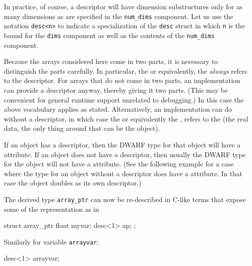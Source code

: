 In practice, of course, a  descriptor will have
dimension substructures only for as many dimensions as are
specified in the \texttt{num\_dims} component. Let us use the notation
\texttt{desc\textless n\textgreater}   
to indicate a specialization of the \texttt{desc} struct in
which \texttt{n} is the bound for the \texttt{dims} component as well as the
contents of the \texttt{num\_dims} component.

Because the arrays considered here come in two parts, it is
necessary to distinguish the parts carefully. In particular,
the  or equivalently, the  \emph{always} refers to the descriptor. For
arrays that do not come in two parts, an implementation can
provide a descriptor anyway, thereby giving it two parts. (This
may be convenient for general runtime support unrelated to
debugging.) In this case the above vocabulary applies as
stated. Alternatively, an implementation can do without a
descriptor, in which case the 
or equivalently the , refers
to the  (the real data, the only thing around
that can be the object).

If an object has a descriptor, then the DWARF type for that
object will have a 
\DWATdatalocation{} 
attribute. If an object
does not have a descriptor, then usually the DWARF type for the
object will not have a 
\DWATdatalocation{} attribute. 
(See the following
 example for a case where the type for an object without
a descriptor does have a 
\DWATdatalocation{} attribute. In
that case the object doubles as its own descriptor.)

The  derived type \texttt{array\_ptr} can now be re-described
in C-like terms that expose some of the representation as in
\par %
\begin{nlnlisting}
struct array_ptr {
    float myvar;
    desc<1> ap;
};
\end{nlnlisting}

Similarly for variable \texttt{arrayvar}:
\par %
\begin{nlnlisting}
desc<1> arrayvar;
\end{nlnlisting}

